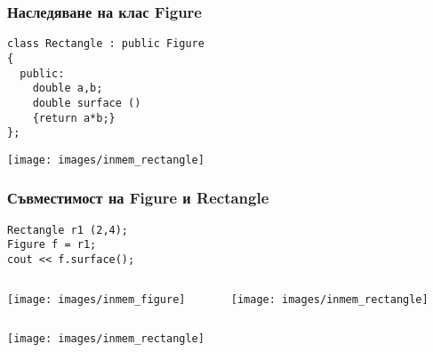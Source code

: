 \documentclass{beamer}
\begin{document}
\begin{frame}[fragile]
\frametitle{Наследяване на клас Figure}


\begin{flushleft}
\begin{lstlisting}
class Rectangle : public Figure
{
  public:
    double a,b;
    double surface ()
    {return a*b;}
};
\end{lstlisting}
\end{flushleft}


\begin{center}
\texttt{[image: images/inmem\_rectangle]}
\end{center}


\end{frame}



\begin{frame}[fragile]
\frametitle{Съвместимост на Figure и Rectangle}


\begin{flushleft}
\begin{lstlisting}
Rectangle r1 (2,4);
Figure f = r1;
cout << f.surface();
\end{lstlisting}
\end{flushleft}



\begin{columns}[t]
  \hspace{-150px}
  \begin{column}{0.5\textwidth}
\begin{center}
\texttt{[image: images/inmem\_figure]}
\end{center}

  \end{column}
  \begin{column}{0.5\textwidth}
\begin{center}
  \hspace{-150px}
\texttt{[image: images/inmem\_rectangle]}
\end{center}

  \end{column}
\end{columns}

\begin{center}
\texttt{[image: images/inmem\_rectangle]}
\end{center}


\end{frame}
\end{document}
